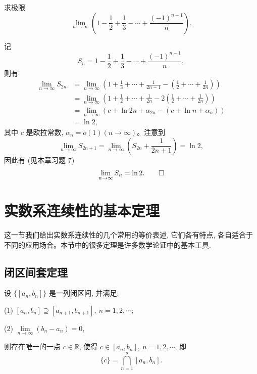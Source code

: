 \begin{example}\label{example:ma-2-3-4}
求极限
\[
  \lim_{n\to\infty}\left(1-\frac12+\frac13-\cdots+\frac{(-1)^{n-1}}n\right).
\]
\end{example}


\begin{solve}
记
\[
  S_n=1-\frac12+\frac13-\cdots+\frac{(-1)^{n-1}}n,
\]
则有
\[
\begin{aligned}
  \lim_{n\to\infty}S_{2n}
  &=
  \lim_{n\to\infty}
  \left(1+\frac13+\cdots+\frac1{2n-1}
  -\left(\frac12+\cdots+\frac1{2n}\right)\right)\\
  &=
  \lim_{n\to\infty}
  \left(1+\frac12+\cdots+\frac1{2n}
  -2\left(\frac12+\cdots+\frac1{2n}\right)\right)\\
  &=
  \lim_{n\to\infty}
  \left(c+\ln2n+\alpha_{2n}-(c+\ln n+\alpha_n)\right)\\
  &=
  \ln2,
\end{aligned}
\]
其中 $c$ 是欧拉常数, $\alpha_n=o(1)(n\to\infty)$。注意到
\[
  \lim_{n\to\infty}S_{2n+1}
  =
  \lim_{n\to\infty}\left(S_{2n}+\frac1{2n+1}\right)
  =
  \ln2,
\]
因此有 (见本章习题 7)
\[
  \lim_{n\to\infty}S_n=\ln2.
\qedhere
\]
\end{solve}


\section{实数系连续性的基本定理}
\label{sec:ma-2-4}

这一节我们给出实数系连续性的几个常用的等价表述, 它们各有特点, 各自适合于不同的应用场合。本节中的很多定理是许多数学论证中的基本工具.

\subsection{闭区间套定理}
\label{subsec:ma-2-4-1}

\begin{theorem}[{闭区间套定理}]\label{theorem:ma-2-4-1}
设 $\{[a_n,b_n]\}$ 是一列闭区间, 并满足:

(1) $[a_n,b_n]\supseteq[a_{n+1},b_{n+1}],\ n=1,2,\cdots$;

(2) $\lim\limits_{n\to\infty}(b_n-a_n)=0$,

则存在唯一的一点 $c\in\mathbb{R}$, 使得 $c\in[a_n,b_n],\ n=1,2,\cdots$, 即
\[
  \{c\}=\bigcap_{n=1}^\infty [a_n,b_n].
\]
\end{theorem}


